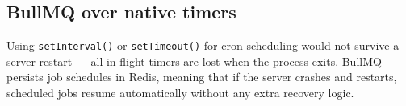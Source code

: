\subsection{BullMQ over native timers}
 
Using \texttt{setInterval()} or \texttt{setTimeout()} for cron scheduling would not survive a server restart --- all in-flight timers are lost when the process exits. BullMQ persists job schedules in Redis, meaning that if the server crashes and restarts, scheduled jobs resume automatically without any extra recovery logic.
